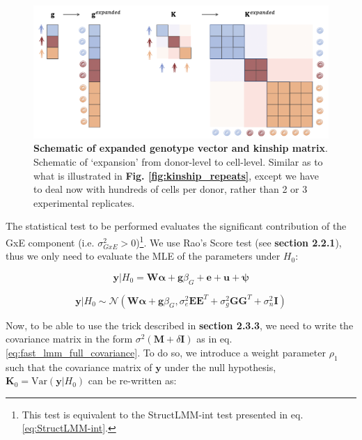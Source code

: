 \begin{figure}[h]
\centering
\includegraphics[width=15.5cm]{Chapter6/Fig/sc_structlmm_expanded.png}
\caption[Schematic of expanded genotype vector and kinship matrix]{\textbf{Schematic of expanded genotype vector and kinship matrix}.\\
Schematic of `expansion' from donor-level to cell-level.
Similar as to what is illustrated in \textbf{Fig. \ref{fig:kinship_repeats}}, except we have to deal now with hundreds of cells per donor, rather than 2 or 3 experimental replicates.}
\label{fig:sc_structlmm_expanded}
\end{figure}


The statistical test to be performed evaluates the significant contribution of the GxE component (i.e. $\sigma_{GxE}^2 > 0$)\footnote{This test is equivalent to the StructLMM-int test presented in eq. \eqref{eq:StructLMM-int}.}.
We 
use Rao's Score test (see \textbf{section 
2.2.1}), thus we only need to evaluate the MLE of the parameters 
under $H_0$:

\begin{equation}\label{eq:scStructLMM_H0}
 \mathbf{y}|H_0 =  \mathbf{W}\boldsymbol{\alpha} + \mathbf{g}\beta_G + \mathbf{e} + \mathbf{u} + \boldsymbol{\psi} 
\end{equation}

\begin{equation}\label{eq:scStructLMM_H0_MVN}
 \mathbf{y}|H_0 \sim \mathcal{N}( \mathbf{W}\boldsymbol{\alpha} + \mathbf{g}\beta_G, \sigma_e^2 \mathbf{E}\mathbf{E}^T + \sigma_g^2 \mathbf{G}\mathbf{G}^T+ \sigma_n^2 \mathbf{I} )
\end{equation}

Now, to be able to use the trick described in \textbf{section 
2.3.3}, 
we need to write the covariance matrix in the form $\sigma^2(\mathbf{M}+\delta\mathbf{I})$ as in eq.
\eqref{eq:fast_lmm_full_covariance}.
To do so, we introduce a weight parameter $\rho_1$ such that the covariance matrix of $\mathbf{y}$ under the null hypothesis, $\mathbf{K}_0 = \mathrm{Var}(\mathbf{y} | H_0)$ can be re-written as:

